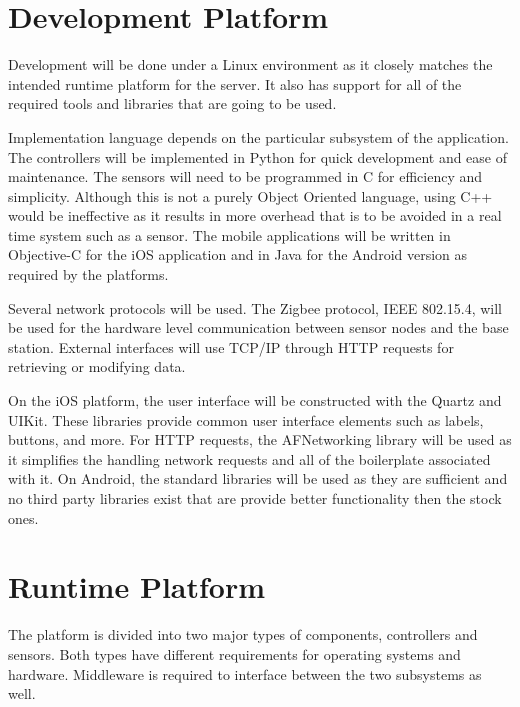 \documentclass{report}
\begin{document}
\section{Development Platform}


Development will be done under a Linux environment as it closely matches the
intended runtime platform for the server. It also has support for all of the
required tools and libraries that are going to be used. 

Implementation language depends on the particular subsystem of the application.
The controllers will be implemented in Python for quick development and ease of 
maintenance. The sensors will need to be programmed in C for efficiency and
simplicity. Although this is not a purely Object Oriented language, using C++
would be ineffective as it results in more overhead that is to be avoided in a
real time system such as a sensor. The mobile applications will be written in
Objective-C for the iOS application and in Java for the Android version as
required by the platforms.

Several network protocols will be used. The Zigbee protocol, IEEE
802.15.4, will be used for the hardware level communication between
sensor nodes and the base station. External interfaces will use TCP/IP
through HTTP requests for retrieving or modifying data.

On the iOS platform, the user interface will be constructed with the Quartz and
UIKit. These libraries provide common user interface elements such as labels,
buttons, and more. For HTTP requests, the AFNetworking library will be used as
it simplifies the handling network requests and all of the boilerplate
associated with it. On Android, the standard libraries will be used as they are
sufficient and no third party libraries exist that are provide better
functionality then the stock ones.



\section{Runtime Platform}
The platform is divided into two major types of components, controllers and
sensors. Both types have different requirements for operating systems and
hardware. Middleware is required to interface between the two subsystems as well. 
\end{document}
